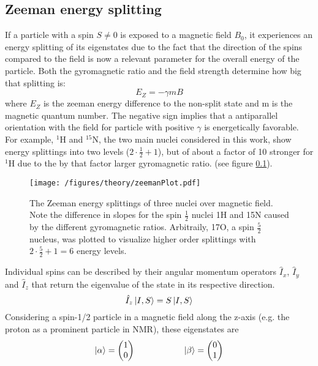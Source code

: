         \subsection{Zeeman energy splitting}
            If a particle with a spin $S\neq 0$ is exposed to a magnetic field $B_0$, it experiences an energy splitting of its eigenstates due to the fact that the direction of the spins compared to the field is now a relevant parameter for the overall energy of the particle. Both the gyromagnetic ratio and the field strength determine how big that splitting is:
            \begin{equation}
                E_{Z} = -\gamma m B
            \end{equation}
            where $E_Z$ is the zeeman energy difference to the non-split state and m is the magnetic quantum number. The negative sign implies that a antiparallel orientation with the field for particle with positive $\gamma$ is energetically favorable. For example, $^1$H and $^{15}$N, the two main nuclei considered in this work, show energy splittings into two levels ($2\cdot\tfrac{1}{2}+1$), but of about a factor of 10 stronger for $^1$H due to the by that factor larger gyromagnetic ratio. (see figure \ref{}).
            \begin{figure}
                \centering
                \texttt{[image: /figures/theory/zeemanPlot.pdf]}
                \caption[Zeeman energy splitting]{The Zeeman energy splittings of three nuclei over magnetic field. Note the difference in slopes for the spin $\tfrac{1}{2}$ nuclei 1H and 15N caused by the different gyromagnetic ratios. Arbitraily, 17O, a spin $\tfrac{5}{2}$ nucleus, was plotted to visualize higher order splittings with $2 \cdot\tfrac{5}{2}+1 = 6$ energy levels. }
            \end{figure}
            Individual spins can be described by their angular momentum operators $\hat{I}_x$, $\hat{I}_y$ and $\hat{I}_z$ that return the eigenvalue of the state in its respective direction.
            \begin{equation}
                \hat I_z \ket{I, S} = S \ket{I,S}
            \end{equation}
            Considering a spin-1/2 particle in a magnetic field along the z-axis (e.g. the proton as a prominent particle in NMR), these eigenstates are
            \begin{equation}
            \ket\alpha = \begin{pmatrix}1\\0\end{pmatrix} \hspace{2 cm} \ket\beta =
            \begin{pmatrix}0\\1\end{pmatrix}
            \end{equation}
